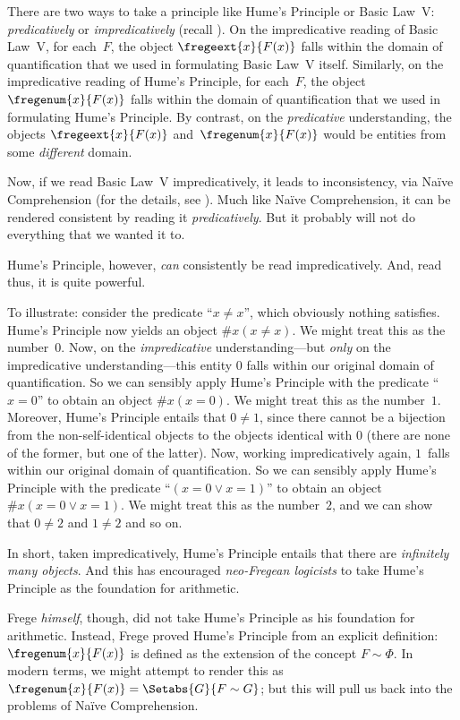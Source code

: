 \documentclass[../../../include/open-logic-section]{subfiles}
\begin{document}
There are two ways to take a principle like Hume's Principle or Basic
Law~V: \emph{predicatively} or \emph{impredicatively} (recall
). On the impredicative reading of
Basic Law~V, for each~$F$, the object $\fregeext{x}{F(x)}$ falls
within the domain of quantification that we used in formulating Basic
Law~V itself. Similarly, on the impredicative reading of Hume's
Principle, for each~$F$, the object $\fregenum{x}{F(x)}$ falls within
the domain of quantification that we used in formulating Hume's
Principle. By contrast, on the \emph{predicative} understanding, the
objects $\fregeext{x}{F(x)}$ and~$\fregenum{x}{F(x)}$ would be
entities from some \emph{different} domain. 

Now, if we read Basic Law~V impredicatively, it leads to
inconsistency, via Na\"ive Comprehension (for the details, see
). Much like Na\"ive Comprehension, it can be
rendered consistent by reading it \emph{predicatively}. But it
probably will not do everything that we wanted it to. 

Hume's Principle, however, \emph{can} consistently be read
impredicatively. And, read thus, it is quite powerful.

To illustrate: consider the predicate ``$x \neq x$'', which obviously
nothing satisfies. Hume's Principle now yields an object $\# x( x\neq
x)$. We might treat this as the number~$0$. Now, on the
\emph{impredicative} understanding---but \emph{only} on the
impredicative understanding---this entity $0$ falls within our
original domain of quantification. So we can sensibly apply Hume's
Principle with the predicate ``$x = 0$'' to obtain an object $\#x (x =
0)$. We might treat this as the number~$1$. Moreover, Hume's Principle
entails that $0 \neq 1$, since there cannot be a bijection from the
non-self-identical objects to the objects identical with $0$ (there
are none of the former, but one of the latter). Now, working
impredicatively again, $1$~falls within our original domain of
quantification. So we can sensibly apply Hume's Principle with the
predicate ``$(x = 0 \lor x = 1)$'' to obtain an object $\#x(x = 0 \lor
x = 1)$. We might treat this as the number~$2$, and we can show that
$0\neq 2$ and $1 \neq 2$ and so on. 

In short, taken impredicatively, Hume's Principle entails that there
are \emph{infinitely many objects}. And this has encouraged
\emph{neo-Fregean logicists} to take Hume's Principle as the
foundation for arithmetic. 

Frege \emph{himself}, though, did not take Hume's Principle as his
foundation for arithmetic. Instead, Frege proved Hume's Principle from
an explicit definition: $\fregenum{x}{F(x)}$ is defined as the extension of
the concept $F \sim \Phi$. In modern terms, we might attempt to render
this as $\fregenum{x}{F(x)} = \Setabs{G}{F \sim G}$; but this will pull us
back into the problems of Na\"ive Comprehension.
\end{document}
